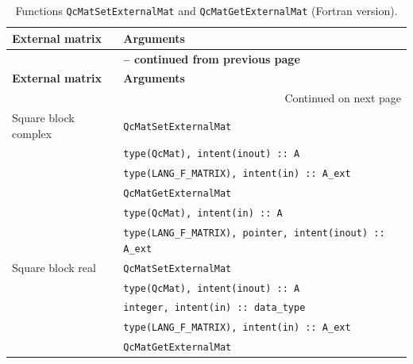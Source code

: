 \documentclass[a4paper,11pt,twoside,openright]{book}
\begin{document}
\begin{center}
  \small
  \begin{longtable}{p{}|l}
    \caption{Functions \texttt{QcMatSetExternalMat}
      and \texttt{QcMatGetExternalMat} (Fortran version).}
    \label{tab-QcMat-external-F}\\
    \hline\hline
    \textbf{External matrix} & \textbf{Arguments}\\
    \hline
    \endfirsthead
    \multicolumn{2}{c}{{\bfseries \tablename\ \thetable{} -- continued from previous page}}\\
    \hline\hline
    \textbf{External matrix} & \textbf{Arguments}\\
    \hline
    \endhead
    \hline
    \multicolumn{2}{r}{Continued on next page}\\
    \hline
    \endfoot
    \hline\hline
    \endlastfoot
%
    Square block complex & \verb|QcMatSetExternalMat|\\
    & \hspace*{2ex}\verb|type(QcMat), intent(inout) :: A|\\
    & \hspace*{2ex}\verb|type(LANG_F_MATRIX), intent(in) :: A_ext|\\
    \cline{2-2}
    & \verb|QcMatGetExternalMat|\\
    & \hspace*{2ex}\verb|type(QcMat), intent(in) :: A|\\
    & \hspace*{2ex}\verb|type(LANG_F_MATRIX), pointer, intent(inout) :: A_ext|\\
    \hline
    Square block real & \verb|QcMatSetExternalMat|\\
    & \hspace*{2ex}\verb|type(QcMat), intent(inout) :: A|\\
    & \hspace*{2ex}\verb|integer, intent(in) :: data_type|\\
    & \hspace*{2ex}\verb|type(LANG_F_MATRIX), intent(in) :: A_ext|\\
    \cline{2-2}
    & \verb|QcMatGetExternalMat|\\

\end{longtable}
\end{center}
\end{document}
